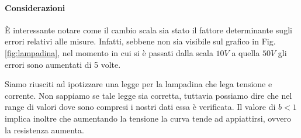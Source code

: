 \paragraph{Considerazioni\\}
È interessante notare come il cambio scala sia stato il fattore determinante sugli errori relativi alle misure. Infatti, sebbene non sia visibile sul grafico in Fig.\ref{fig:lampadina}, nel momento in cui si è passati dalla scala $10V$ a quella $50V$ gli errori sono aumentati di 5 volte.
 
Siamo riusciti ad ipotizzare una legge per la lampadina che lega tensione e corrente. Non sappiamo se tale legge sia corretta, tuttavia possiamo dire che nel range di valori dove sono compresi i nostri dati essa è verificata. Il valore di $b<1$ implica inoltre che aumentando la tensione la curva tende ad appiattirsi, ovvero la resistenza aumenta. 